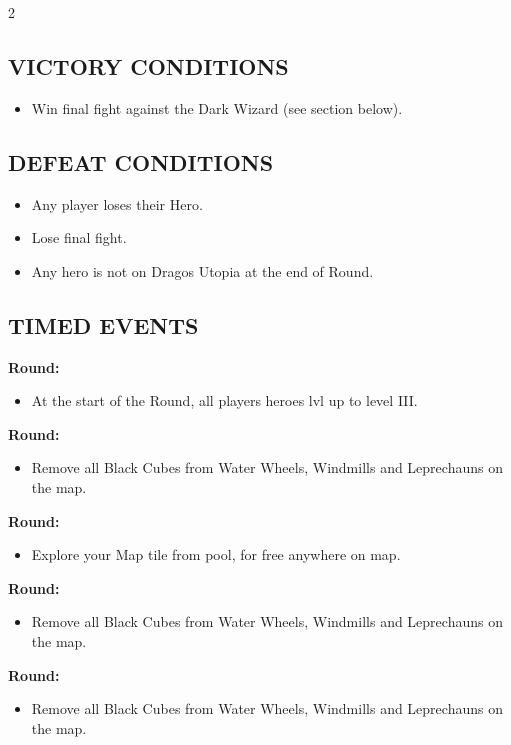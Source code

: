\begin{multicols}{2}
\subsection*{\MakeUppercase{Victory Conditions}}

\begin{itemize}
   \item Win final fight against the Dark Wizard (see section below).
\end{itemize}

\subsection*{\MakeUppercase{Defeat Conditions}}

\begin{itemize}
  \item Any player loses their Hero.
  \item Lose final fight.
  \item Any hero is not on Dragos Utopia at the end of  Round.
\end{itemize}

\subsection*{\MakeUppercase{Timed Events}}
\textbf{ Round:}
\begin{itemize}
  \item At the start of the Round, all players heroes lvl up to level III.
\end{itemize}
\textbf{ Round:}
\begin{itemize}
  \item Remove all Black Cubes from Water Wheels, Windmills and Leprechauns on the map.
\end{itemize}
\textbf{ Round:}
\begin{itemize}
  \item Explore your Map tile from pool, for free anywhere on map.
\end{itemize}
\textbf{ Round:}
\begin{itemize}
  \item Remove all Black Cubes from Water Wheels, Windmills and Leprechauns on the map.
\end{itemize}
\textbf{ Round:}
\begin{itemize}
  \item Remove all Black Cubes from Water Wheels, Windmills and Leprechauns on the map.
\end{itemize}


\end{multicols}
